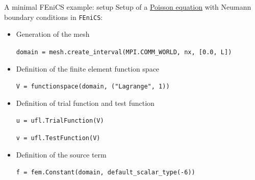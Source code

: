 \begin{frame}{A minimal FEniCS example: setup}
   \small{Setup of a \underline{Poisson equation} with Neumann boundary conditions in \texttt{FEniCS}:}

   \vspace{0.2cm}

   \begin{itemize}
      \item \small{Generation of the mesh}
      
      \begin{tcolorbox}[pythoncode]
         \footnotesize{\texttt{\textcolor{cyan!60!black}{domain} = \textcolor{violet!80!black}{mesh}.\textcolor{green!40!black}{create\_interval}(\textcolor{violet!80!black}{MPI}.\textcolor{green!40!black}{COMM\_WORLD}, \textcolor{cyan!60!black}{nx}, [\textcolor{brown!70!black}{0.0}, \textcolor{cyan!60!black}{L}])}}
      \end{tcolorbox}

      \item \small{Definition of the finite element function space}
      
      \begin{tcolorbox}[pythoncode]
         \footnotesize{\texttt{\textcolor{cyan!60!black}{V} = \textcolor{green!40!black}{functionspace}(\textcolor{cyan!60!black}{domain}, (\textcolor{red!80!black}{"Lagrange"}, \textcolor{brown!70!black}{1}))}}
      \end{tcolorbox}

      \item \small{Definition of trial function and test function}
      
      \begin{tcolorbox}[pythoncode]
         \footnotesize{\texttt{\textcolor{cyan!60!black}{u} = \textcolor{violet!80!black}{ufl}.\textcolor{green!40!black}{TrialFunction}(\textcolor{cyan!60!black}{V})}}

         \footnotesize{\texttt{\textcolor{cyan!60!black}{v} = \textcolor{violet!80!black}{ufl}.\textcolor{green!40!black}{TestFunction}(\textcolor{cyan!60!black}{V})}}
      \end{tcolorbox}

      \item \small{Definition of the source term}
      
      \begin{tcolorbox}[pythoncode]
         \footnotesize{\texttt{\textcolor{cyan!60!black}{f} = \textcolor{violet!80!black}{fem}.\textcolor{green!40!black}{Constant}(\textcolor{cyan!60!black}{domain}, \textcolor{green!40!black}{default\_scalar\_type}(\textcolor{brown!70!black}{-6}))}}
      \end{tcolorbox}
   \end{itemize}
\end{frame}

